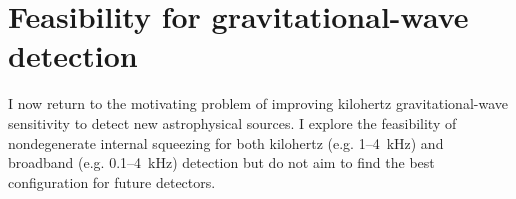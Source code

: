 \section{Feasibility for gravitational-wave detection}
\label{sec:nIS_sigRO_feasibility}

I now return to the motivating problem of improving kilohertz gravitational-wave sensitivity to detect new astrophysical sources. I explore the feasibility of nondegenerate internal squeezing for both kilohertz (e.g. 1--4~kHz) and broadband (e.g. 0.1--4~kHz) detection but do not aim to find the best configuration for future detectors. %


\label{sec:nIS_kHz}

